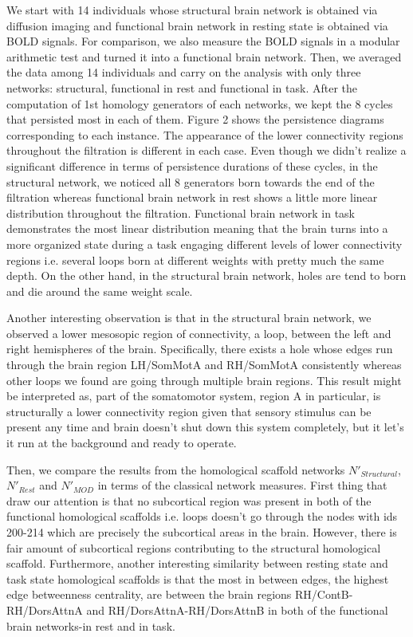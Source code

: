 \documentclass[9pt,twocolumn,twoside,lineno]{pnas-new}
\begin{document}
We start with 14 individuals whose structural brain network is obtained via diffusion imaging and functional brain network in resting state is obtained via BOLD signals. For comparison, we also measure the BOLD signals in a modular arithmetic test and turned it into a functional brain network. Then, we averaged the data among 14 individuals and carry on the analysis with only three networks: structural, functional in rest and functional in task. After the computation of 1st homology generators of each networks, we kept the 8 cycles that persisted most in each of them. Figure 2 shows the persistence diagrams corresponding to each instance. The appearance of the lower connectivity regions throughout the filtration is different in each case. Even though we didn't realize a significant difference in terms of persistence durations of these cycles, in the structural network, we noticed all 8 generators born towards the end of the filtration whereas functional brain network in rest shows a little more linear distribution throughout the filtration. Functional brain network in task demonstrates the most linear distribution meaning that the brain turns into a more organized state during a task engaging different levels of lower connectivity regions i.e. several loops born at different weights with pretty much the same depth. On the other hand, in the structural brain network, holes are tend to born and die around the same weight scale. 

Another interesting observation is that in the structural brain network, we observed a lower mesosopic region of connectivity, a loop, between the left and right hemispheres of the brain. Specifically, there exists a hole whose edges run through the brain region LH/SomMotA and RH/SomMotA consistently whereas other loops we found are going through multiple brain regions. This result might be interpreted as, part of the somatomotor system, region A in particular, is structurally a lower connectivity region given that sensory stimulus can be present any time and brain doesn't shut down this system completely, but it let's it run at the background and ready to operate.

Then, we compare the results from the homological scaffold networks $N'_{Structural}$, $N'_{Rest}$ and $N'_{MOD}$ in terms of the classical network measures. First thing that draw our attention is that no subcortical region was present in both of the functional homological scaffolds i.e. loops doesn't go through the nodes with ids 200-214 which are precisely the subcortical areas  in the brain. However, there is fair amount of subcortical regions contributing to the structural homological scaffold. Furthermore, another interesting similarity between resting state and task state homological scaffolds is that the most in between edges, the highest edge betweenness centrality, are between the brain regions RH/ContB-RH/DorsAttnA and RH/DorsAttnA-RH/DorsAttnB in both of the functional brain networks-in rest and in task. 
\end{document}
